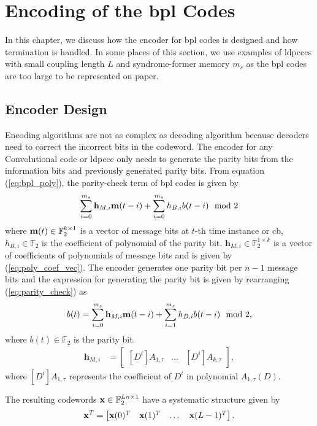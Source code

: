 \chapter{Encoding of the \acrlong{bpl} Codes}\label{ch:encode}
In this chapter, we discuss how the encoder for \gls{bpl} codes is designed and how termination is handled. In some places of this section, we use examples of \glspl{ldpccc} with small coupling length $L$ and syndrome-former memory $m_s$ as the \gls{bpl} codes are too large to be represented on paper.

\section{Encoder Design}\label{sec:enc_design}
Encoding algorithms are not as complex as decoding algorithm because decoders need to correct the incorrect bits in the codeword. The encoder for any Convolutional code or \gls{ldpccc} only needs to generate the parity bits from the information bits and previously generated parity bits. From equation (\ref{eq:bpl_poly}), the parity-check term of \gls{bpl} codes is given by
\begin{align}\label{eq:parity_check}
\sum_{i=0}^{m_s}\mathbf{h}_{M,i}\mathbf{m}(t-i)+\sum_{i=0}^{m_s}h_{B,i}b(t-i) \mod 2
\end{align}
where $\mathbf{m}(t)\in\mathbb{F}_2^{k\times 1}$ is a vector of message bits at $t$-th time instance or \gls{cb}, $h_{B,i}\in\mathbb{F}_2$ is the coefficient of polynomial of the parity bit. $\mathbf{h}_{M,i}\in\mathbb{F}_2^{1\times k}$ is a vector of coefficients of polynomials of message bits and is given by (\ref{eq:poly_coef_vec}).
The encoder generates one parity bit per $n-1$ message bits and the expression for generating the parity bit is given by rearranging (\ref{eq:parity_check}) as
\begin{align}\label{eq:parity_bit}
b(t)=\sum_{i=0}^{m_s}\mathbf{h}_{M,i}\mathbf{m}(t-i)+\sum_{i=1}^{m_s}h_{B,i}b(t-i) \mod 2,
\end{align}
where $b(t)\in\mathbb{F}_2$ is the parity bit.
\begin{align}\label{eq:poly_coef_vec}
\mathbf{h}_{M,i}&=
\begin{bmatrix}
[D^i]A_{1,\tau} &\dots &[D^i]A_{k,\tau}
\end{bmatrix},
\end{align}
where $[D^i]A_{1,\tau}$ represents the coefficient of $D^i$ in polynomial $A_{1,\tau}(D)$.

The resulting codewords $\mathbf{x}\in\mathbb{F}_2^{Ln\times 1}$ have a systematic structure given by \begin{align}\mathbf{x}^T=\begin{bmatrix}\mathbf{x}(0)^T &\mathbf{x}(1)^T &\dots &\mathbf{x}(L-1)^T\end{bmatrix}.\end{align}

